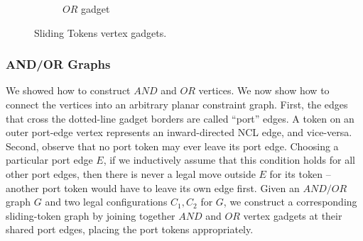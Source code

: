 \begin{figure} [H]
\begin{subfigure}[b]{0.4\textwidth}
\begin{scaletikzpicturetowidth}{\textwidth}
    \end{scaletikzpicturetowidth}
    \caption{$OR$ gadget}
    \label{fig:or_gadget_sliding_token}
  \end{subfigure}
  \caption{Sliding Tokens vertex gadgets.}
  \label{fig:and_or_gadgets_sliding_token}
\end{figure}

\subsubsection{AND/OR Graphs}\label{subsubsection:and_or}
We showed how to construct $AND$ and $OR$ vertices. We now show how to connect the vertices into an arbitrary planar constraint graph.
First, the edges that cross the dotted-line gadget borders are called “port” edges. A token on an outer port-edge vertex represents an
inward-directed NCL edge, and vice-versa. Second, observe that no port token may ever leave its port edge. Choosing a particular port
edge $E$, if we inductively assume that this condition holds for all other port edges, then there is never a legal move outside $E$ for
its token – another port token would have to leave its own edge first.
Given an $AND/OR$ graph $G$ and two legal configurations $C_1, C_2$ for $G$, we construct a corresponding sliding-token graph by joining together
$AND$ and $OR$ vertex gadgets at their shared port edges, placing the port tokens appropriately.


